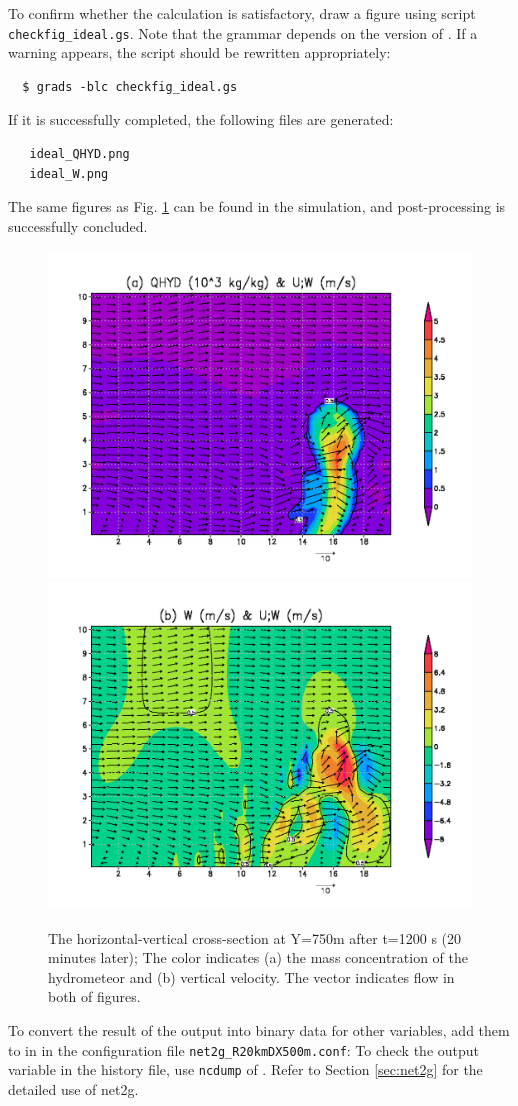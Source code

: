 To confirm whether the calculation is satisfactory,
draw a figure using \grads script \verb|checkfig_ideal.gs|.
Note that the grammar depends on the version of \grads.
If a warning appears, the \grads script should be rewritten appropriately:
\begin{verbatim}
  $ grads -blc checkfig_ideal.gs
\end{verbatim}
If it is successfully completed, the following files are generated:

\begin{verbatim}
   ideal_QHYD.png
   ideal_W.png
\end{verbatim}
The same figures as Fig. \ref{fig_ideal} can be found in the simulation,
and post-processing is successfully concluded.

\begin{figure}[htb]
\begin{center}
  \includegraphics[width=0.65\hsize]{./figure/ideal_qhyd.png}\\
  \includegraphics[width=0.65\hsize]{./figure/ideal_W.png}\\
  \caption{The horizontal-vertical cross-section at Y=750m after t=1200 s (20 minutes later);
            The color indicates (a) the mass concentration of the hydrometeor and (b) vertical velocity. The vector indicates flow in both of figures.}
  \label{fig_ideal}
\end{center}
\end{figure}

To convert the result of the output into binary data for other variables,
add them to  in  in the configuration file \verb|net2g_R20kmDX500m.conf|:
To check the output variable in the history file, use \verb|ncdump| of {\netcdf}.
Refer to Section \ref{sec:net2g} for the detailed use of net2g.


